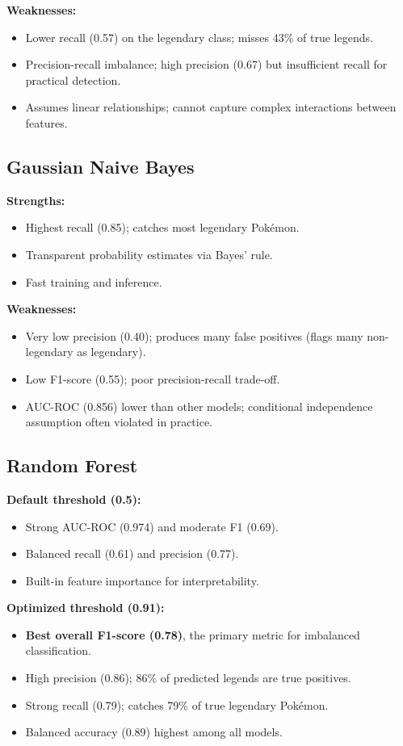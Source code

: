\textbf{Weaknesses:}
\begin{itemize}
  \item Lower recall (0.57) on the legendary class; misses 43\% of true legends.
  \item Precision-recall imbalance; high precision (0.67) but insufficient recall for practical detection.
  \item Assumes linear relationships; cannot capture complex interactions between features.
\end{itemize}

\subsection{Gaussian Naive Bayes}

\textbf{Strengths:}
\begin{itemize}
  \item Highest recall (0.85); catches most legendary Pokémon.
  \item Transparent probability estimates via Bayes' rule.
  \item Fast training and inference.
\end{itemize}

\textbf{Weaknesses:}
\begin{itemize}
  \item Very low precision (0.40); produces many false positives (flags many non-legendary as legendary).
  \item Low F1-score (0.55); poor precision-recall trade-off.
  \item AUC-ROC (0.856) lower than other models; conditional independence assumption often violated in practice.
\end{itemize}

\subsection{Random Forest}

\textbf{Default threshold (0.5):}
\begin{itemize}
  \item Strong AUC-ROC (0.974) and moderate F1 (0.69).
  \item Balanced recall (0.61) and precision (0.77).
  \item Built-in feature importance for interpretability.
\end{itemize}

\textbf{Optimized threshold (0.91):}
\begin{itemize}
  \item \textbf{Best overall F1-score (0.78)}, the primary metric for imbalanced classification.
  \item High precision (0.86); 86\% of predicted legends are true positives.
  \item Strong recall (0.79); catches 79\% of true legendary Pokémon.
  \item Balanced accuracy (0.89) highest among all models.
\end{itemize}

